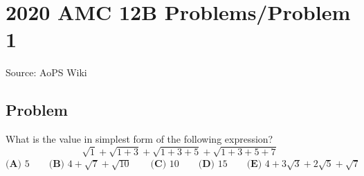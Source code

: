 \documentclass[12pt]{article}
\begin{document}
\section*{{2020 AMC 12B Problems/Problem 1}}
Source: AoPS Wiki

\subsection*{Problem}
What is the value in simplest form of the following expression? \[\sqrt{1} + \sqrt{1+3} + \sqrt{1+3+5} + \sqrt{1+3+5+7}\] $\textbf{(A) }5 \qquad \textbf{(B) }4 + \sqrt{7} + \sqrt{10} \qquad \textbf{(C) } 10 \qquad \textbf{(D) } 15 \qquad \textbf{(E) } 4 + 3\sqrt{3} + 2\sqrt{5} + \sqrt{7}$
\end{document}
